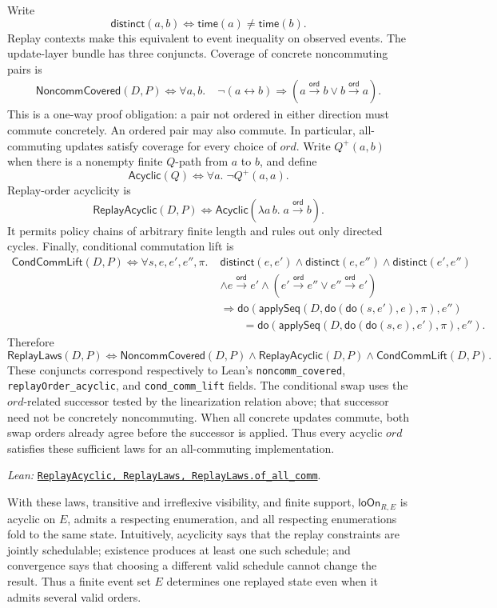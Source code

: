 \documentclass[11pt]{article}
\theoremstyle{definition}
\newcommand{\applySeq}{\mathsf{applySeq}}
\newcommand{\doop}{\mathsf{do}}
\newcommand{\ord}{\mathrel{\xrightarrow{\mathsf{ord}}}}
\newcommand{\loOn}{\mathsf{loOn}}
\newcommand{\lean}[1]{\texttt{#1}}
\newcommand{\src}[2]{\href{../../#1}{\texttt{#2}}}
\newcommand{\anchor}[2]{\par\smallskip\noindent\emph{Lean: }\src{#1}{#2}.}
\begin{document}
Write
\[
 \mathsf{distinct}(a,b)\Longleftrightarrow
 \mathsf{time}(a)\ne\mathsf{time}(b).
\]
Replay contexts make this equivalent to event inequality on observed events.
The update-layer bundle has three conjuncts. Coverage of concrete
noncommuting pairs is
\[
\begin{aligned}
 \mathsf{NoncommCovered}(D,P)\Longleftrightarrow
 \forall a,b.\;&
 \neg(a\leftrightarrow b)\Longrightarrow
 (a\ord b\lor b\ord a).
\end{aligned}
\]
This is a one-way proof obligation: a pair not ordered in either direction
must commute concretely. An ordered pair may also commute. In particular,
all-commuting updates satisfy coverage for every choice of $ord$.
Write $Q^{+}(a,b)$ when there is a nonempty finite $Q$-path from $a$ to $b$,
and define
\[
 \mathsf{Acyclic}(Q)\Longleftrightarrow
 \forall a.\;\neg Q^{+}(a,a).
\]
Replay-order acyclicity is
\[
 \mathsf{ReplayAcyclic}(D,P)\Longleftrightarrow
 \mathsf{Acyclic}(\lambda a\,b.\;a\ord b).
\]
It permits policy chains of arbitrary finite length and rules out only directed
cycles. Finally,
conditional commutation lift is
\[
\begin{aligned}
 \mathsf{CondCommLift}(D,P)\Longleftrightarrow
 \forall s,e,e',e'',\pi.\;&
 \mathsf{distinct}(e,e')\land\mathsf{distinct}(e,e'')
 \land\mathsf{distinct}(e',e'')\\
 &\land e\ord e'
 \land(e'\ord e''\lor e''\ord e')\\
 &\Longrightarrow
 \doop(\applySeq(D,\doop(\doop(s,e'),e),\pi),e'')\\
 &\qquad=
 \doop(\applySeq(D,\doop(\doop(s,e),e'),\pi),e'').
\end{aligned}
\]
Therefore
\[
 \mathsf{ReplayLaws}(D,P)\Longleftrightarrow
 \mathsf{NoncommCovered}(D,P)\land
 \mathsf{ReplayAcyclic}(D,P)\land
 \mathsf{CondCommLift}(D,P).
\]
These conjuncts correspond respectively to Lean's
\lean{noncomm\_covered}, \lean{replayOrder\_acyclic}, and
\lean{cond\_comm\_lift} fields.
The conditional swap uses the $ord$-related successor tested by the
linearization relation above; that successor need not be concretely
noncommuting. When all concrete updates commute, both swap orders already
agree before the successor is applied. Thus every acyclic $ord$ satisfies
these sufficient laws for an all-commuting implementation.
\anchor{Sal/MRDTs/Framework/ReplayLaws.lean}
  {ReplayAcyclic, ReplayLaws, ReplayLaws.of\_all\_comm}

With these laws, transitive and irreflexive visibility, and finite support,
$\loOn_{R,E}$ is acyclic on $E$, admits a respecting enumeration, and all
respecting enumerations fold to the same state. Intuitively, acyclicity says
that the replay constraints are jointly schedulable; existence produces at
least one such schedule; and convergence says that choosing a different valid
schedule cannot change the result. Thus a finite event set $E$ determines one
replayed state even when it admits several valid orders.
\end{document}
